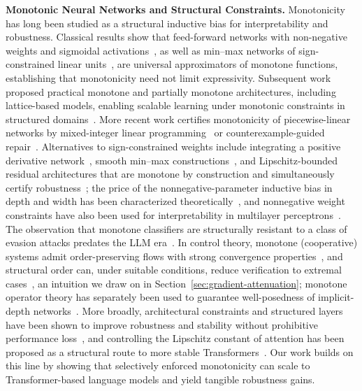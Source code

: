 \documentclass{article}
\theoremstyle{plain}
\theoremstyle{definition}
\theoremstyle{remark}
\theoremstyle{plain}
\begin{document}
\textbf{Monotonic Neural Networks and Structural Constraints.}
Monotonicity has long been studied as a structural inductive bias for interpretability and robustness. Classical results show that feed-forward networks with non-negative weights and sigmoidal activations~\citep{Daniels2010Monotone}, as well as min--max networks of sign-constrained linear units~\citep{Sill1998MonotonicNetworks}, are universal approximators of monotone functions, establishing that monotonicity need not limit expressivity. Subsequent work proposed practical monotone and partially monotone architectures, including lattice-based models, enabling scalable learning under monotonic constraints in structured domains~\citep{Gupta2016MonotonicLattices,You2017DeepLattice}. More recent work certifies monotonicity of piecewise-linear networks by mixed-integer linear programming~\citep{liu2020certified} or counterexample-guided repair~\citep{sivaraman2020counterexample}.
Alternatives to sign-constrained weights include integrating a positive derivative network~\citep{wehenkel2019unconstrained}, smooth min--max constructions~\citep{igel2024smooth}, and Lipschitz-bounded residual architectures that are monotone by construction and simultaneously certify robustness~\citep{nolte2023expressive,kitouni2023robust}; the price of the nonnegative-parameter inductive bias in depth and width has been characterized theoretically~\citep{mikulincer2022size}, and nonnegative weight constraints have also been used for interpretability in multilayer perceptrons~\citep{chorowski2015learning}. The observation that monotone classifiers are structurally resistant to a class of evasion attacks predates the LLM era~\citep{incer2018adversarially}. In control theory, monotone (cooperative) systems admit order-preserving flows with strong convergence properties~\citep{hirsch2006monotone,angeli2003monotone}, and structural order can, under suitable conditions, reduce verification to extremal cases~\citep{feyzmahdavian2017stability}, an intuition we draw on in Section~\ref{sec:gradient-attenuation}; monotone operator theory has separately been used to guarantee well-posedness of implicit-depth networks~\citep{winston2020monotone}. More broadly, architectural constraints and structured layers have been shown to improve robustness and stability without prohibitive performance loss~\citep{Amos2017OptNet}, and controlling the Lipschitz constant of attention has been proposed as a structural route to more stable Transformers~\citep{kim2021lipschitz,newhouse2025training}. Our work builds on this line by showing that selectively enforced monotonicity can scale to Transformer-based language models and yield tangible robustness gains.
\end{document}
